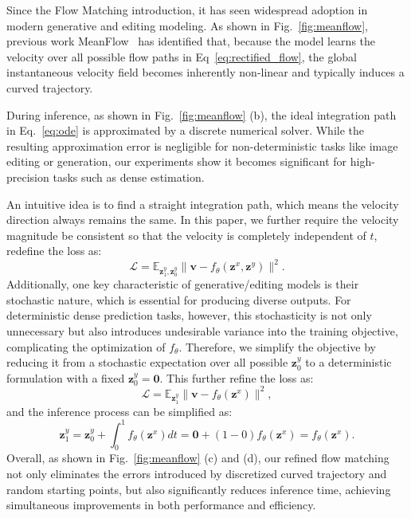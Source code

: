 \documentclass{article} %
\begin{document}
Since the Flow Matching introduction, it has seen widespread adoption in modern generative and editing modeling. As shown in Fig.~\ref{fig:meanflow}, previous work MeanFlow~\citep{meanflow} has identified that, because the model learns the  velocity over all possible flow paths in Eq~\ref{eq:rectified_flow}, the global instantaneous velocity field becomes inherently non-linear and typically induces a curved trajectory. 

During inference, as shown in Fig.~\ref{fig:meanflow} (b), the ideal integration path in Eq.~\ref{eq:ode} is approximated by a discrete numerical solver. While the resulting approximation error is negligible for non-deterministic tasks like image editing or generation, our experiments show it becomes significant for high-precision tasks such as dense estimation.

An intuitive idea is to find a straight integration path, which means the velocity direction always remains the same. In this paper, we further require the velocity magnitude be consistent so that the velocity is completely independent of $t$, redefine the loss as:
\begin{equation}
	\label{eq:loss_consistent}
			\mathcal{L} = \mathbb{E}_{\mathbf{z}^y_1,\mathbf{z}^y_0} \| \mathbf{v} - f_\theta(\mathbf{z}^x,\mathbf{z}^y) \|^2.
\end{equation}
Additionally, one key characteristic of generative/editing models is their stochastic nature, which is essential for producing diverse outputs. For deterministic dense prediction tasks, however, this stochasticity is not only unnecessary but also introduces undesirable variance into the training objective, complicating the optimization of $f_\theta$. Therefore, we simplify the objective by reducing it from a stochastic expectation over all possible $\mathbf{z}^y_0$ to a deterministic formulation with a fixed $\mathbf{z}^y_0 = \mathbf{0}$. This further refine the loss as:
\begin{equation}
  \label{eq:loss_simplified}
      \mathcal{L} =  \mathbb{E}_{\mathbf{z}^y_1} \|\mathbf{v} - f_\theta(\mathbf{z}^x) \|^2,
\end{equation}
and the inference process can be simplified as:
\begin{equation}
  \label{eq:inference_simplified}
      \mathbf{z}^y_1 = \mathbf{z}^y_0 + \int_0^1 f_\theta(\mathbf{z}^x) dt = \mathbf{0} + (1-0)f_\theta(\mathbf{z}^x) = f_\theta(\mathbf{z}^x).
\end{equation}
Overall, as shown in Fig.~\ref{fig:meanflow} (c) and (d), our refined flow matching not only eliminates the errors introduced by discretized curved trajectory and random starting points, but also significantly reduces inference time, achieving simultaneous improvements in both performance and efficiency.
\end{document}
